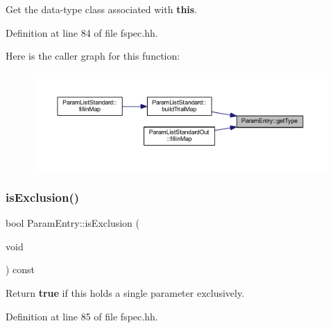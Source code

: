 Get the data-\/type class associated with {\bfseries{this}}. 



Definition at line 84 of file fspec.\+hh.

Here is the caller graph for this function\+:
\nopagebreak
\begin{figure}[H]
\begin{center}
\leavevmode
\includegraphics[width=350pt]{class_param_entry_aeb33e71b09562418a0a2a88650d6403a_icgraph}
\end{center}
\end{figure}
\mbox{\label{class_param_entry_a1c72a43ac9238f9fae35f38b88ef2010}} 
\subsubsection{\texorpdfstring{isExclusion()}{isExclusion()}}
{\footnotesize\ttfamily bool Param\+Entry\+::is\+Exclusion (\begin{DoxyParamCaption}\item[{void}]{ }\end{DoxyParamCaption}) const\hspace{0.3cm}{\ttfamily [inline]}}



Return {\bfseries{true}} if this holds a single parameter exclusively. 



Definition at line 85 of file fspec.\+hh.

